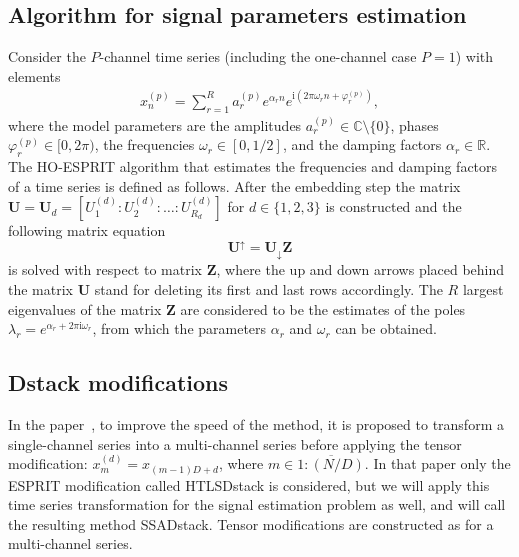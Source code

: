\documentclass[12pt]{article}
\newcommand{\iu}{\mathrm{i}}
\theoremstyle{definition}
\begin{document}
\subsection{Algorithm for signal parameters estimation}
Consider the $P$-channel time series (including the one-channel case $P=1$) with elements
\begin{gather*}
  x_n^{(p)}= \sum_{r=1}^{R} a_r^{(p)} e^{\alpha_r n} e^{\iu\left(2\pi
  \omega_r n + \varphi_r^{(p)}\right)},
\end{gather*}
where the model parameters are the amplitudes $a_r^{(p)} \in
\mathbb{C}\setminus\{0\}$, phases ${\varphi_r^{(p)} \in [0, 2\pi)}$,
the frequencies $\omega_r\in [0, 1/2]$, and the damping factors $\alpha_r \in
\mathbb{R}$. The HO-ESPRIT algorithm that estimates the frequencies
and damping factors of a time series is defined as follows.
After the embedding step the matrix $\mathbf{U} = \mathbf{U}_d =
\left[U_1^{(d)} :
U_2^{(d)}:\ldots : U_{R_d}^{(d)}\right]$ for $d\in \{1, 2,
3\}$ is constructed and the following matrix equation
\begin{equation*}
  \mathbf{U}^{\uparrow}=\mathbf{U}_{\downarrow}\mathbf{Z}
\end{equation*}
is solved with respect to matrix $\mathbf{Z}$, where the up and down
arrows placed
behind the matrix $\mathbf{U}$ stand for deleting its first and last
rows accordingly.
The $R$ largest eigenvalues of the matrix $\mathbf{Z}$ are considered
to be the estimates of the poles $\lambda_r = e^{\alpha_r + 2\pi\iu
\omega_r}$, from which the parameters $\alpha_r$ and $\omega_r$ can be obtained.

\subsection{Dstack modifications}
In the paper~\cite{Papy2009}, to improve the speed of the method, it
is proposed to transform a single-channel series into a multi-channel
series before applying the tensor modification: $x_m^{(d)} =
x_{(m-1)D + d}$, where $m \in \overline{1:(N/D)}$. In that paper only
the ESPRIT modification called HTLSDstack is considered, but we will
apply this time series transformation for the signal estimation
problem as well, and will call the resulting method SSADstack.
Tensor modifications are constructed as for a multi-channel series.
\end{document}
